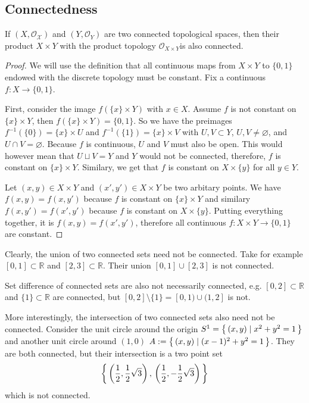 \subsection{Connectedness}
\begin{thmbox}
    \begin{lemma}
    If \((X, \mathcal{O_X})\) and \((Y, \mathcal{O}_Y)\) are two connected topological spaces, then their product \(X \times Y\) with the product topology \(\mathcal{O}_{X \times Y}\)is also connected.
    \end{lemma}
\end{thmbox}
%
\begin{proof}
    We will use the definition that all continuous maps from \(X \times Y\) to \(\{0, 1\}\) endowed with the discrete topology must be constant. Fix a continuous \(f: X \longrightarrow \{0, 1\}\).
    
    First, consider the image \(f(\{x\} \times Y)\) with \(x \in X\). Assume \(f\) is not constant on \(\{x\} \times Y\), then \(f(\{x\} \times Y) = \{0, 1\}\). So we have the preimages \(f^{-1}(\{0\}) = \{x\} \times U\) and \(f^{-1}(\{1\}) = \{x\} \times V\) with \(U, V \subset Y\), \(U, V \neq \varnothing\), and \(U \cap V = \varnothing\). Because \(f\) is continuous, \(U\) and \(V\) must also be open. This would however mean that \(U \sqcup V = Y\) and \(Y\) would not be connected, therefore, \(f\) is constant on \(\{x\} \times Y\). Similary, we get that \(f\) is constant on \(X \times \{y\}\) for all \(y \in Y\).

    Let \((x, y) \in X \times Y\) and \((x', y') \in X \times Y\) be two arbitary points. We have \(f(x, y) = f(x, y')\) because \(f\) is constant on \(\{x\} \times Y\) and similary \(f(x, y') = f(x', y')\) because \(f\) is constant on \(X \times \{y\}\). Putting everything together, it is \(f(x, y) = f(x',y')\), therefore all continuous \(f: X \times Y \longrightarrow \{0, 1\}\) are constant.
\end{proof}
%
\begin{example}
    Clearly, the union of two connected sets need not be connected. Take for example \([0, 1] \subset \mathbb{R}\) and \([2, 3] \subset \mathbb{R}\). Their union \([0, 1] \cup [2, 3]\) is not connected.

    Set difference of connected sets are also not necessarily connected, e.g. \([0, 2] \subset \mathbb{R}\) and \(\{1\} \subset \mathbb{R}\) are connected, but \([0, 2] \setminus \{1\} = [0, 1) \cup (1, 2]\) is not.

    More interestingly, the intersection of two connected sets also need not be connected. Consider the unit circle around the origin \(S^1 = \left\{\, (x, y) \mid x^2 + y^2 = 1 \,\right\}\) and another unit circle around \((1, 0)\) \(A := \left\{\, (x, y) \mid (x-1)^2 + y^2 = 1 \,\right\}\). They are both connected, but their intersection is a two point set
    \begin{equation*}
        \left\{\, \left(\frac{1}{2}, \frac{1}{2}\sqrt{3}\right),\, \left(\frac{1}{2}, -\frac{1}{2}\sqrt{3}\right) \,\right\}
    \end{equation*}
    which is not connected.
\end{example}
